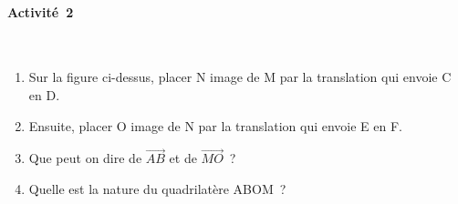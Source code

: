 \documentclass[a4paper,12pt,twocolumn,landscape]{article}
\renewcommand{\vect}[9]{
	\coordinate(#1) at (#3,#4);
	\coordinate(#2) at (#5,#6);
	\draw (#1) -- (#2) node [fill=white,midway,above,sloped] {
	};
	\draw (#1) node [fill=white,#7] {#1};
	\draw (#2) node [fill=white,#8] {#2};
	\draw [->,>=stealth,line width=1.5pt] (#1) -- (#2);
}
\begin{document}
\begin{minipage}{0.45\textwidth}
\thispagestyle{firststyle}

\vspace*{1em}


\paragraph{Activité~2} ~\\


\begin{center}
\end{center}

\begin{enumerate}
	\item Sur la figure ci-dessus, placer N image de M par la translation qui envoie C en D.
	\item Ensuite, placer O image de N par la translation qui envoie E en F.
	\item Que peut on dire de $\overrightarrow{AB}$ et de $\overrightarrow{MO}$~?
	\item Quelle est la nature du quadrilatère ABOM~?
\end{enumerate}



\end{minipage}
\end{document}
